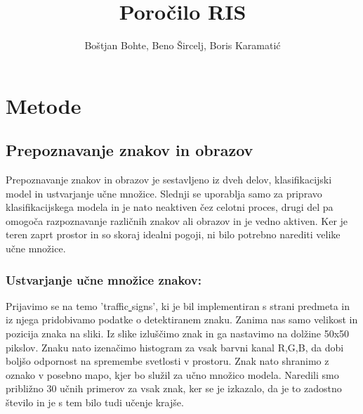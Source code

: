 \documentclass{llncs}
\begin{document}
\title{Poročilo RIS}
%
%
\author{Boštjan Bohte, Beno Šircelj,  Boris Karamatić}
%
%
%

\maketitle              %

\begin{abstract}

\keywords{}
\end{abstract}
%

\section{Metode}
\subsection{Prepoznavanje znakov in obrazov}
Prepoznavanje znakov in obrazov je sestavljeno iz dveh delov, klasifikacijski model in ustvarjanje učne množice. Slednji se uporablja samo za pripravo klasifikacijskega modela in je nato neaktiven čez celotni proces, drugi del pa omogoča razpoznavanje različnih znakov ali obrazov in je vedno aktiven. Ker je teren zaprt prostor in so skoraj idealni pogoji, ni bilo potrebno narediti velike učne množice. 

\subsubsection{Ustvarjanje učne množice znakov:} 

Prijavimo se na temo 'traffic\underline{ }signs', ki je bil implementiran s strani predmeta in iz njega pridobivamo podatke o detektiranem znaku. Zanima nas samo velikost in pozicija znaka na sliki. Iz slike izluščimo znak in ga nastavimo na dolžine 50x50 pikslov. Znaku nato izenačimo histogram za vsak barvni kanal R,G,B, da dobi boljšo odpornost na spremembe svetlosti v prostoru. Znak nato shranimo z oznako v posebno mapo, kjer bo služil za učno množico modela. Naredili smo približno 30 učnih primerov za vsak znak, ker se je izkazalo, da je to zadostno število in je s tem bilo tudi učenje krajše. 
\end{document}
